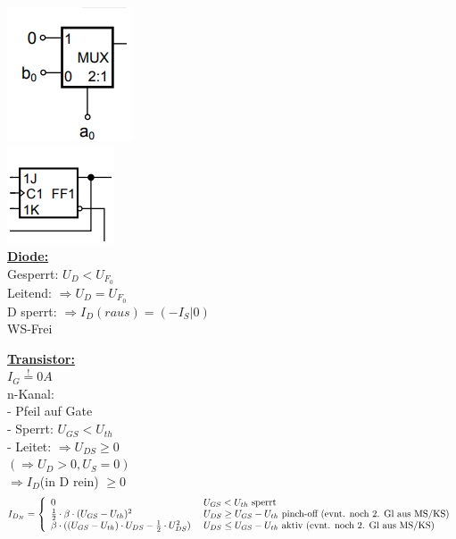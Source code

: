 \documentclass[8pt]{extarticle}
\begin{document}
\begin{minipage}{0.33\textwidth}
\vspace{-1cm}
\includegraphics[scale=0.40]{Mult.png}\\
\includegraphics[scale=0.40]{FF.png}\\

\underline{\textbf{Diode:}}\\
Gesperrt: $U_D < U_{F_0}$\\
Leitend: $\Rightarrow U_D = U_{F_0}$\\
D sperrt: $\Rightarrow I_D(raus) = (-I_S|0)$\\
WS-Frei

\underline{\textbf{Transistor:}}\\
$I_G \stackrel{!}{=} 0A$\\

n-Kanal:\\
- Pfeil auf Gate\\
- Sperrt: $U_{GS} < U_{th}$\\
- Leitet: $\Rightarrow U_{DS} \geq 0$\\
\phantom{sssssiisi} $ (\Rightarrow U_D > 0, U_S = 0)$\\
\phantom{sssssiisssi}$\Rightarrow I_D$(in D rein) $\geq 0$\\
\[I_{D_N} = \left\{
  \begin{array}{ll}
      0 & U_{GS} < U_{th}~$sperrt$\\
        \frac{1}{2} \cdot \beta \cdot(U_{GS} - U_{th})^2  \ & U_{DS} \ge U_{GS} - U_{th}$~pinch-off (evnt. noch 2. Gl aus MS/KS)$\\
        \beta \cdot((U_{GS} - U_{th}) \cdot U_{DS} - \frac{1}{2} \cdot U_{DS}^2)  \ & U_{DS} \leq U_{GS} - U_{th}$~aktiv (evnt. noch 2. Gl aus MS/KS)$\\
  \end{array}
\right.
\]


\end{minipage}
\end{document}
